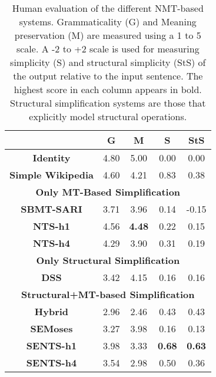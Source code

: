 \documentclass[11pt,a4paper]{article}
\begin{document}
\begin{center}
\begin{table}[ht]
\scriptsize
\centering
\begin{tabular}{|c|c|c|c|c|}
\hline
& {\bf G} & {\bf M} & {\bf S} & {\bf StS} \\
\hline\hline
{\bf Identity} & 4.80 &  5.00 & 0.00 & 0.00 \\
\hline    
{\bf Simple Wikipedia} & 4.60 & 4.21 &  0.83 &  0.38 \\
\hline\hline
\multicolumn{5}{|c|}{{\bf Only MT-Based Simplification}}\\
\hline
{\bf SBMT-SARI} & 3.71& 3.96& 0.14& -0.15 \\
\hline
{\bf NTS-h1} & 4.56 & {\bf 4.48} & 0.22 & 0.15 \\

\hline
{\bf NTS-h4} & 4.29 & 3.90 & 0.31 & 0.19 \\
\hline\hline
\multicolumn{5}{|c|}{{\bf Only Structural Simplification}}\\
\hline
{\bf DSS}& 3.42& 4.15&  0.16& 0.16 \\
\hline\hline
\multicolumn{5}{|c|}{{\bf Structural+MT-based Simplification}}\\
\hline
{\bf Hybrid} & 2.96 & 2.46 & 0.43 & 0.43 \\
\hline
{\bf SEMoses}& 3.27 & 3.98 & 0.16 & 0.13 \\
\hline
{\bf SENTS-h1} & 3.98 & 3.33 & {\bf 0.68} & {\bf 0.63} \\
\hline
{\bf SENTS-h4} & 3.54 & 2.98 & 0.50 & 0.36 \\
\hline
\end{tabular}
\hfill
\caption{Human evaluation of the different NMT-based systems. Grammaticality (G) and Meaning preservation (M) are measured using a 1 to 5 scale. A -2 to +2 scale is used for measuring simplicity (S) and structural simplicity (StS) of the output relative to the input sentence. The highest score in each column appears in bold.
Structural simplification systems are those that explicitly model structural operations.}
\label{human_evaluation}
\end{table}
\end{center}
\vspace{-1.02cm}
\end{document}
